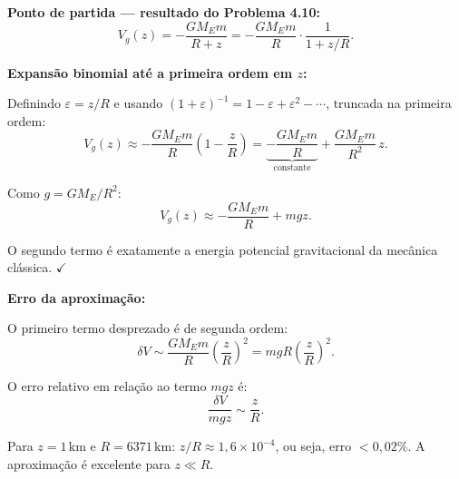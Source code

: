 \textbf{Ponto de partida — resultado do Problema 4.10:}
\[
V_g(z) = -\frac{GM_E m}{R+z} = -\frac{GM_E m}{R}\cdot\frac{1}{1+z/R}.
\]

\textbf{Expansão binomial até a primeira ordem em $z$:}

Definindo $\varepsilon = z/R$ e usando $(1+\varepsilon)^{-1} = 1 - \varepsilon + \varepsilon^2 - \cdots$,
truncada na primeira ordem:
\[
V_g(z) \approx -\frac{GM_E m}{R}\left(1 - \frac{z}{R}\right)
= \underbrace{-\frac{GM_E m}{R}}_{\text{constante}} + \frac{GM_E m}{R^2}\,z.
\]

Como $g = GM_E/R^2$:
\[
\boxed{V_g(z) \approx -\frac{GM_E m}{R} + mgz.}
\]

O segundo termo é exatamente a energia potencial gravitacional da mecânica clássica. $\checkmark$

\textbf{Erro da aproximação:}

O primeiro termo desprezado é de segunda ordem:
\[
\delta V \sim \frac{GM_E m}{R}\left(\frac{z}{R}\right)^2 = mgR\left(\frac{z}{R}\right)^2.
\]

O erro relativo em relação ao termo $mgz$ é:
\[
\frac{\delta V}{mgz} \sim \frac{z}{R}.
\]

Para $z = 1\,\mathrm{km}$ e $R = 6371\,\mathrm{km}$: $z/R \approx 1{,}6\times10^{-4}$, ou seja, erro $< 0{,}02\%$.
A aproximação é excelente para $z \ll R$.